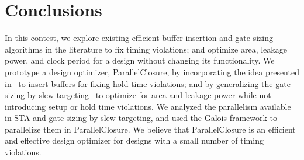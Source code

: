 \section{Conclusions}
\label{sec:conclusions}

In this contest, we explore existing efficient buffer insertion and gate sizing algorithms in the literature to fix timing violations; and optimize area, leakage power, and clock period for a design without changing its functionality. We prototype a design optimizer, ParallelClosure, by incorporating the idea presented in~\cite{Shenoy:Minimum} to insert buffers for fixing hold time violations; and by generalizing the gate sizing by slew targeting~\cite{Held:Gate} to optimize for area and leakage power while not introducing setup or hold time violations. We analyzed the parallelism available in STA and gate sizing by slew targeting, and used the Galois framework to parallelize them in ParallelClosure. We believe that ParallelClosure is an efficient and effective design optimizer for designs with a small number of timing violations.
